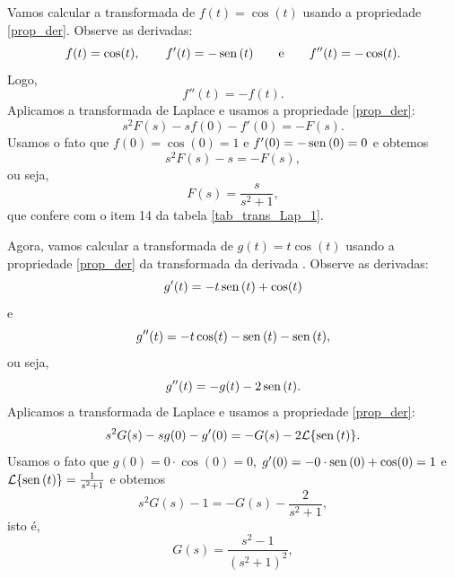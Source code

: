 \begin{ex}Vamos calcular a transformada de $f(t)=\cos(t)$ usando a propriedade \ref{prop_der}. Observe as derivadas:
  \begin{equation}
 f(t)=\cos(t),\qquad f'(t)=-\operatorname{sen}\,(t)\qquad\hbox{e}\qquad f''(t)=-\cos(t).
\end{equation}
Logo, 
 \begin{equation}
f''(t)=-f(t).
\end{equation}
Aplicamos a transformada de Laplace e usamos a propriedade \ref{prop_der}:
 \begin{equation}
s^2F(s)-sf(0)-f'(0)=-F(s).
\end{equation}
Usamos o fato que $f(0)=\cos(0)=1$ e $f'(0)=-\operatorname{sen}\,(0)=0$ e obtemos
 \begin{equation}
s^2F(s)-s=-F(s),
\end{equation}
ou seja,
 \begin{equation}
F(s)=\frac{s}{s^2+1},
\end{equation}
que confere com o item 14 da tabela \ref{tab_trans_Lap_1}.
\end{ex}
\begin{ex}Agora, vamos calcular a transformada de $g(t)=t\cos(t)$ usando a propriedade \ref{prop_der} da transformada da derivada . Observe as derivadas:
 \begin{equation}
g'(t)=-t\operatorname{sen}\,(t)+\cos(t)
\end{equation}
e
 \begin{equation}
g''(t)=-t\cos(t)-\operatorname{sen}\,(t)-\operatorname{sen}\,(t),
\end{equation}
ou seja,
 \begin{equation}
g''(t)=-g(t)-2\operatorname{sen}\,(t).
\end{equation}
Aplicamos a transformada de Laplace e usamos a propriedade \ref{prop_der}:
 \begin{equation}
s^2G(s)-sg(0)-g'(0)=-G(s)-2\mathcal{L}\{\operatorname{sen}\,(t)\}.
\end{equation}
Usamos o fato que $g(0)=0\cdot\cos(0)=0$, $g'(0)=-0\cdot \operatorname{sen}\,(0)+\cos(0)=1$ e $\mathcal{L}\{\operatorname{sen}\,(t)\}=\frac{1}{s^2+1}$ e obtemos
 \begin{equation}
s^2G(s)-1=-G(s)-\frac{2}{s^2+1},
\end{equation}
isto é,
 \begin{equation}
G(s)=\frac{s^2-1}{(s^2+1)^2},
\end{equation}
\end{ex}

